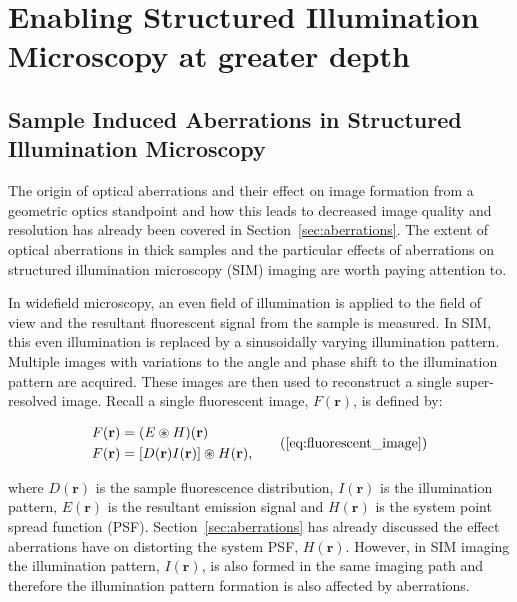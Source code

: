\chapter{Enabling Structured Illumination Microscopy at greater depth}

\section{Sample Induced Aberrations in Structured Illumination Microscopy}
\label{sec:sample_aberrations_SIM}

The origin of optical aberrations and their effect on image
formation from a geometric optics standpoint and how this leads 
to decreased image quality and resolution has already been covered 
in Section~\ref{sec:aberrations}. The extent of optical 
aberrations in thick samples and the particular effects of
aberrations on structured illumination microscopy (SIM) imaging 
are worth paying attention to. 

In widefield microscopy, an even field of illumination is 
applied to the field of view and the resultant fluorescent
signal from the sample is measured. In SIM, this even 
illumination is replaced by a sinusoidally varying
illumination pattern. Multiple images with variations to the angle 
and phase shift to the illumination pattern are acquired. 
These images are then used to reconstruct a single 
super-resolved image\cite{gustafsson2000surpassing,gustafsson2008three}.
Recall a single fluorescent image, $F(\textbf{r})$, is 
defined by:

\begin{equation}
\begin{split}
F(\textbf{r}) &= (E \circledast H)(\textbf{r})\\
F(\textbf{r}) &= [D(\textbf{r})I(\textbf{r})] \circledast H(\textbf{r}),\\
\end{split}\tag{\ref{eq:fluorescent_image}}
\end{equation}

where $D(\textbf{r})$ is the sample fluorescence distribution, 
$I(\textbf{r})$ is the illumination pattern, $E(\textbf{r})$ is
the resultant emission signal and $H(\textbf{r})$ is the system 
point spread function (PSF). Section~\ref{sec:aberrations} has already
discussed the effect aberrations have on distorting the system
PSF, $H(\textbf{r})$. However, in SIM imaging the illumination 
pattern, $I(\textbf{r})$, is also formed in the same imaging path
and therefore the illumination pattern formation is also 
affected by aberrations.


